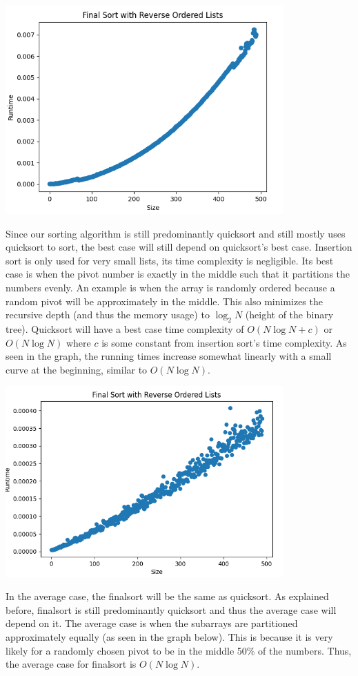 \documentclass{article}
\begin{document}
\includegraphics[width=0.8\textwidth]{finalSortReverseOrderedLists}

Since our sorting algorithm is still predominantly quicksort and still mostly uses quicksort to sort, the best case will still depend on quicksort’s best case. Insertion sort is only used for very small lists, its time complexity is negligible. Its best case is when the pivot number is exactly in the middle such that it partitions the numbers evenly. An example is when the array is randomly ordered because a random pivot will be approximately in the middle. This also minimizes the recursive depth (and thus the memory usage) to $\log_2 N$ (height of the binary tree). Quicksort will have a best case time complexity of $O(N\log N + c)$ or $O(N\log N)$ where $c$ is some constant from insertion sort’s time complexity. As seen in the graph, the running times increase somewhat linearly with a small curve at the beginning, similar to $O(N\log N)$.

\includegraphics[width=0.8\textwidth]{finalSortRandomLists}

In the average case, the finalsort will be the same as quicksort. As explained before, finalsort is still predominantly quicksort and thus the average case will depend on it. The average case is when the subarrays are partitioned approximately equally (as seen in the graph below). This is because it is very likely for a randomly chosen pivot to be in the middle 50\% of the numbers. Thus, the average case for finalsort is $O(N\log N)$.
\end{document}
